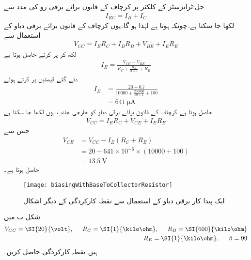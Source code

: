 حل:ٹرانزسٹر کے کلکٹر  پر کرچاف کے قانون برائے برقی رو کی مدد سے
\begin{align*}
I_{RC}=I_B+I_C
\end{align*}
لکھا جا سکتا ہے۔چونکہ  ہوتا ہے لہٰذا  ہو گا۔یوں کرچاف کے قانون برائے برقی دباو کے استعمال سے
\begin{align*}
V_{CC}=I_{E} R_C+I_B R_B +V_{BE}+I_E R_E 
\end{align*}
لکھ کر  پر کرتے حاصل ہوتا ہے
\begin{align*}
I_E=\frac{V_{CC}-V_{BE}}{R_C+\frac{R_B}{\beta+1}+R_E}
\end{align*}
دئے گئے قیمتیں پر کرتے ہوئے
\begin{align*}
I_E&=\frac{20-0.7}{10000+\frac{200000}{99+1}+100}\\
&=\SI{641}{\micro \ampere}
\end{align*}
حاصل ہوتا ہے۔کرچاف کے قانون برائے برقی دباو کو خارجی جانب یوں لکھا جا سکتا ہے
\begin{align*}
V_{CC}=I_E R_C+V_{CE}+I_E R_E
\end{align*}
جس سے
\begin{align*}
V_{CE}&=V_{CC}-I_E \left(R_C+R_E \right)\\
&=20-641 \times 10^{-6} \times \left (10000+100 \right)\\
&=\SI{13.5}{\volt}
\end{align*}
حاصل ہوتا ہے۔
%
\begin{figure}
\centering
\texttt{[image: biasingWithBaseToCollectorResistor]}
\caption{ایک پیدا کار برقی دباو کے استعمال سے نقطہ کارکردگی کے دیگر  اشکال}
\label{شکل_ایک_سپلائی_سے_نکتہ_کارکردگی_کا_حصول}
\end{figure}
شکل  ب میں 
\begin{align*}
V_{CC}=\SI{20}{\volt}, \hspace{5mm} R_C=\SI{1}{\kilo \ohm}, \hspace{5mm} R_B=\SI{600}{\kilo \ohm}\\
R_E=\SI{1}{\kilo \ohm}, \hspace{5mm} \beta=99
\end{align*}
ہیں۔نقطہ کارکردگی حاصل کریں۔

